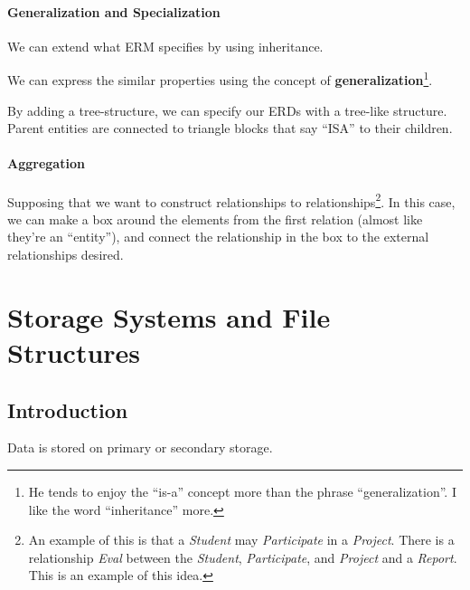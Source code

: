                     \subsubsection{Generalization and Specialization} %
                    \label{ssub:generalization_and_specialization}

                        We can extend what ERM specifies by using inheritance.

                        We can express the similar properties using the concept of \textbf{generalization}\footnote{He tends to enjoy the ``is-a'' concept more than the phrase ``generalization''.
                        I like the word ``inheritance'' more.}.

                        By adding a tree-structure, we can specify our ERDs with a tree-like structure.
                        Parent entities are connected to triangle blocks that say ``ISA'' to their children.
                    \subsubsection{Aggregation} %
                    \label{ssub:aggregation}
                        Supposing that we want to construct relationships to relationships\footnote{An example of this is that a \textit{Student} may \textit{Participate} in a \textit{Project}.
                        There is a relationship \textit{Eval} between the \textit{Student}, \textit{Participate}, and \textit{Project} and a \textit{Report}.
                        This is an example of this idea.}.
                        In this case, we can make a box around the elements from the first relation (almost like they're an ``entity''), and connect the relationship in the box to the external relationships desired.
        \chapter{Storage Systems and File Structures} %
        \label{cha:storage_systems_and_file_structures}
            \section{Introduction} %
            \label{sec:introduction}
                Data is stored on primary or secondary storage.
